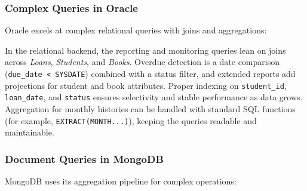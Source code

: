 \documentclass[12pt,a4paper]{article}
\begin{document}
\subsubsection{Complex Queries in Oracle}
Oracle excels at complex relational queries with joins and aggregations:
\begin{comment}
\begin{lstlisting}[language=Java, caption=Oracle Complex Query Implementation]
// Finding overdue loans with student and book details (requires joins)
public List<OverdueLoanReport> getOverdueLoansWithDetails() throws SQLException {
    String sql = """
        SELECT l.loan_id, l.loan_date, l.due_date, l.renewal_count,
               s.name as student_name, s.email as student_email,
               b.title as book_title, b.author as book_author
        FROM Loans l
        JOIN Students s ON l.student_id = s.student_id
        JOIN Books b ON l.book_id = b.book_id
        WHERE l.status = 'ACTIVE' AND l.due_date < SYSDATE
        ORDER BY l.due_date ASC
        """;
    // Execute and map results...
}
\end{lstlisting}
\end{comment}

In the relational backend, the reporting and monitoring queries lean on joins across \textit{Loans}, \textit{Students}, and \textit{Books}. Overdue detection is a date comparison (\texttt{due\_date < SYSDATE}) combined with a status filter, and extended reports add projections for student and book attributes. Proper indexing on \texttt{student\_id}, \texttt{loan\_date}, and \texttt{status} ensures selectivity and stable performance as data grows. Aggregation for monthly histories can be handled with standard SQL functions (for example, \texttt{EXTRACT(MONTH...)}), keeping the queries readable and maintainable.

\subsubsection{Document Queries in MongoDB}
MongoDB uses its aggregation pipeline for complex operations:
\begin{comment}
\begin{lstlisting}[language=Java, caption=MongoDB Aggregation Pipeline]
// Finding overdue loans (requires separate queries or aggregation)
@Override
public List<Loan> getOverdueLoans() {
    LocalDate today = LocalDate.now();
    return findLoans(Filters.and(
        Filters.eq("status", "ACTIVE"),
        Filters.lt("due_date", formatDate(today))));
}

// For detailed reports, multiple queries or aggregation pipeline needed
public List<Document> getOverdueLoansWithDetails() {
    List<Bson> pipeline = Arrays.asList(
        Aggregates.match(Filters.and(
            Filters.eq("status", "ACTIVE"),
            Filters.lt("due_date", formatDate(LocalDate.now())))),
        Aggregates.lookup("students", "student_id", "student_id", "student_info"),
        Aggregates.lookup("books", "book_id", "book_id", "book_info")
    );
    return loans.aggregate(pipeline).into(new ArrayList<>());
}
\end{lstlisting}
\end{comment}
\end{document}
